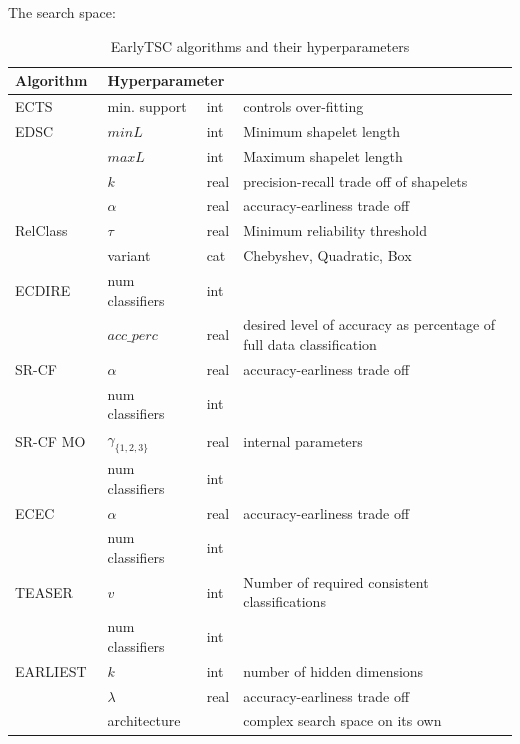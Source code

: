 \documentclass[t,11pt,aspectratio=169]{beamer}
\begin{document}
\begin{frame}[fragile]{The search space:}
\tiny
\begin{table}[ht]
    \centering
    \begin{tabular}{l l l p{6.5cm}}
        \hline
         Algorithm & \multicolumn{2}{l}{Hyperparameter} \\ \hline \hline
         ECTS~\cite{Xing2011} & min. support & int & controls over-fitting \vspace{3px}\\ 
         EDSC~\cite{Xing2011a} & $minL$ & int & Minimum shapelet length\\
         & $maxL$ & int & Maximum shapelet length\\
         & $k$ & real & precision-recall trade off of shapelets\\
         & $\alpha$ & real & accuracy-earliness trade off \vspace{3px}\\ 
         RelClass~\cite{Parrish2013} & $\tau$ & real & Minimum reliability threshold \\
         & variant  & cat & Chebyshev, Quadratic, Box \vspace{3px}\\ 
         ECDIRE~\cite{Mori2016} & num classifiers & int & \\
         & $acc\_perc$ & real & desired level of accuracy as percentage of full data classification \vspace{3px}\\ 
         SR-CF~\cite{Mori2018}  & $\alpha$ & real & accuracy-earliness trade off \\ 
         & num classifiers & int & ~ \vspace{3px}\\ 
         SR-CF MO~\cite{Mori2019} &  $\gamma_{\{1,2,3\}}$ & real & internal parameters \\
         & num classifiers & int & ~ \vspace{3px}\\ 
         ECEC~\cite{Lv2019} & $\alpha$ & real & accuracy-earliness trade off \\ 
         & num classifiers & int & ~ \vspace{3px}\\ 
         TEASER~\cite{Schafer2019} & $v$ & int & Number of required consistent classifications \\
         & num classifiers & int & ~ \vspace{3px}\\ 
         EARLIEST~\cite{Hartvigsen2019} & $k$ & int & number of hidden dimensions\\
         & $\lambda$ & real & accuracy-earliness trade off\\
         & architecture & & complex search space on its own\\
         \hline
    \end{tabular}
    \caption{EarlyTSC algorithms and their hyperparameters}
    \label{tab:algs}
\end{table}
\end{frame}
\end{document}
